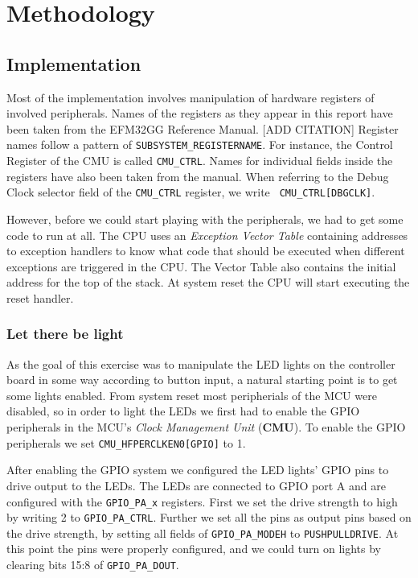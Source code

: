 \chapter{Methodology}

\section{Implementation}

Most of the implementation involves manipulation of hardware registers of
involved peripherals. Names of the registers as they appear in this report have
been taken from the EFM32GG Reference Manual. [ADD CITATION] Register names
follow a pattern of {\tt SUBSYSTEM\_REGISTERNAME}. For instance, the Control
Register of the CMU is called  {\tt CMU\_CTRL}. Names for individual fields
inside the registers have also been taken from the manual. When referring to the
Debug Clock selector field of the {\tt CMU\_CTRL} register, we write {\tt
CMU\_CTRL[DBGCLK]}.

However, before we could start playing with the peripherals, we had to get some
code to run at all. The CPU uses an \emph{Exception Vector Table} containing
addresses to exception handlers to know what code that should be executed when
different exceptions are triggered in the CPU. The Vector Table also contains
the initial address for the top of the stack. At system reset the CPU will start
executing the reset handler.

\subsection{Let there be light}

As the goal of this exercise was to manipulate the LED lights on the controller
board in some way according to button input, a natural starting point is to get
some lights enabled. From system reset most peripherials of the MCU were
disabled, so in order to light the LEDs we first had to enable the GPIO
peripherals in the MCU's \emph{Clock Management Unit} (\textbf{CMU}). To enable
the GPIO peripherals we set {\tt CMU\_HFPERCLKEN0[GPIO]} to 1.

After enabling the GPIO system we configured the LED lights' GPIO pins to drive
output to the LEDs. The LEDs are connected to GPIO port A and are configured
with the {\tt GPIO\_PA\_x} registers. First we set the drive strength to high by
writing 2 to {\tt GPIO\_PA\_CTRL}. Further we set all the pins as output pins
based on the drive strength, by setting all fields of {\tt GPIO\_PA\_MODEH} to
{\tt PUSHPULLDRIVE}. At this point the pins were properly configured, and we
could turn on lights by clearing bits 15:8 of {\tt GPIO\_PA\_DOUT}.

